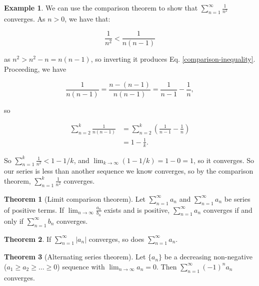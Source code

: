 \documentclass{article}
\theoremstyle{definition}
\newtheorem{example}{Example}[section]
\newtheorem{theorem}{Theorem}[section]
\begin{document}
\begin{example}
We can use the comparison theorem to show that $\sum\limits_{n=1}^\infty \frac{1}{n^2}$ converges. As $n > 0$, we have that:

\begin{equation}\label{comparison-inequality}
\frac{1}{n^2} < \frac{1}{n(n-1)}
\end{equation}

as $n^2 > n^2 -n = n(n-1)$, so inverting it produces Eq. \ref{comparison-inequality}. Proceeding, we have

\begin{equation*}
\frac{1}{n(n-1)} = \frac{n - (n-1)}{n(n-1)} = \frac{1}{n-1} - \frac{1}{n},
\end{equation*}

so 

\begin{align*}
\sum\limits_{n=2}^k \frac{1}{n(n-1)} & = \sum\limits_{n=2}^k \left(\frac{1}{n-1} - \frac{1}{n}\right) \\
& = 1 - \frac{1}{k}.
\end{align*}

So $\sum\limits_{n=1}^k \frac{1}{n^2} < 1 - 1/k$, and $\lim_{k \to \infty} (1 - 1/k) = 1 - 0 = 1$, so it converges. So our series is less than another sequence we know converges, so by the comparison theorem, $\sum\limits_{n=1}^k \frac{1}{n^2}$ converges.
\end{example}

\begin{theorem}[Limit comparison theorem]
Let $\sum\limits_{n=1}^\infty a_n$ and $\sum\limits_{n=1}^\infty a_n$ be series of positive terms. If $\lim_{n \to \infty} \frac{a_n}{b_n}$ exists and is positive, $\sum\limits_{n=1}^\infty a_n$ converges if and only if $\sum\limits_{n=1}^\infty b_n$ converges.
\end{theorem}

\begin{theorem} \label{absolute-convergence-theorem}
If $\sum\limits_{n=1}^\infty |a_n|$ converges, so does $\sum\limits_{n=1}^\infty a_n$.
\end{theorem}

\begin{theorem}[Alternating series theorem]
Let $\{a_n\}$ be a decreasing non-negative ($ a_1 \geq a_2 \geq \ldots \geq 0$) sequence with $\lim_{n \to \infty} a_n = 0$. Then $\sum\limits_{n=1}^\infty (-1)^n a_n$ converges.
\end{theorem}
\end{document}
